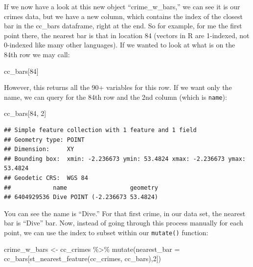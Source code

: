 \documentclass[
]{book}
\newenvironment{Shaded}{\begin{snugshade}}{\end{snugshade}}
\newcommand{\AttributeTok}[1]{\textcolor[rgb]{0.77,0.63,0.00}{#1}}
\newcommand{\DecValTok}[1]{\textcolor[rgb]{0.00,0.00,0.81}{#1}}
\newcommand{\FunctionTok}[1]{\textcolor[rgb]{0.00,0.00,0.00}{#1}}
\newcommand{\NormalTok}[1]{#1}
\newcommand{\OtherTok}[1]{\textcolor[rgb]{0.56,0.35,0.01}{#1}}
\newcommand{\SpecialCharTok}[1]{\textcolor[rgb]{0.00,0.00,0.00}{#1}}
\begin{document}
If we now have a look at this new object ``crime\_w\_bars,'' we can see it is our crimes data, but we have a new column, which contains the index of the closest bar in the cc\_bars dataframe, right at the end. So for example, for me the first point there, the nearest bar is that in location 84 (vectors in R are 1-indexed, not 0-indexed like many other languages). If we wanted to look at what is on the 84th row we may call:

\begin{Shaded}
\begin{Highlighting}[]
\NormalTok{cc\_bars[}\DecValTok{84}\NormalTok{]}
\end{Highlighting}
\end{Shaded}

However, this returns all the 90+ variables for this row. If we want only the name, we can query for the 84th row and the 2nd column (which is \texttt{name}):

\begin{Shaded}
\begin{Highlighting}[]
\NormalTok{cc\_bars[}\DecValTok{84}\NormalTok{, }\DecValTok{2}\NormalTok{]}
\end{Highlighting}
\end{Shaded}

\begin{verbatim}
## Simple feature collection with 1 feature and 1 field
## Geometry type: POINT
## Dimension:     XY
## Bounding box:  xmin: -2.236673 ymin: 53.4824 xmax: -2.236673 ymax: 53.4824
## Geodetic CRS:  WGS 84
##            name                  geometry
## 6404929536 Dive POINT (-2.236673 53.4824)
\end{verbatim}

You can see the name is ``Dive.'' For that first crime, in our data set, the nearest bar is ``Dive'' bar. Now, instead of going through this process manually for each point, we can use the index to subset within our \texttt{mutate()} function:

\begin{Shaded}
\begin{Highlighting}[]
\NormalTok{crime\_w\_bars  }\OtherTok{\textless{}{-}}\NormalTok{ cc\_crimes }\SpecialCharTok{\%\textgreater{}\%} 
  \FunctionTok{mutate}\NormalTok{(}\AttributeTok{nearest\_bar =}\NormalTok{ cc\_bars[}\FunctionTok{st\_nearest\_feature}\NormalTok{(cc\_crimes, cc\_bars),}\DecValTok{2}\NormalTok{])}
\end{Highlighting}
\end{Shaded}
\end{document}
